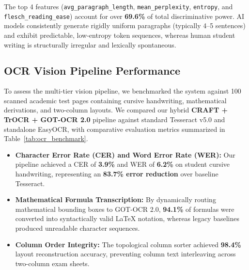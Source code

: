 \documentclass[journal]{IEEEtran}
\begin{document}
The top 4 features (\texttt{avg\_paragraph\_length}, \texttt{mean\_perplexity}, \texttt{entropy}, and \texttt{flesch\_reading\_ease}) account for over \textbf{69.6\%} of total discriminative power. AI models consistently generate rigidly uniform paragraphs (typically 4--5 sentences) and exhibit predictable, low-entropy token sequences, whereas human student writing is structurally irregular and lexically spontaneous.

\subsection{OCR Vision Pipeline Performance}
To assess the multi-tier vision pipeline, we benchmarked the system against 100 scanned academic test pages containing cursive handwriting, mathematical derivations, and two-column layouts. We compared our hybrid \textbf{CRAFT + TrOCR + GOT-OCR 2.0} pipeline against standard Tesseract v5.0 and standalone EasyOCR, with comparative evaluation metrics summarized in Table~\ref{tab:ocr_benchmark}.

\begin{table}[!t]
\caption{OCR Benchmark on Academic Assignments}
\label{tab:ocr_benchmark}
\centering
{}
\end{table}

\begin{itemize}
    \item \textbf{Character Error Rate (CER) and Word Error Rate (WER):} Our pipeline achieved a CER of \textbf{3.9\%} and WER of \textbf{6.2\%} on student cursive handwriting, representing an \textbf{83.7\% error reduction} over baseline Tesseract.
    \item \textbf{Mathematical Formula Transcription:} By dynamically routing mathematical bounding boxes to GOT-OCR 2.0, \textbf{94.1\%} of formulas were converted into syntactically valid \LaTeX{} notation, whereas legacy baselines produced unreadable character sequences.
    \item \textbf{Column Order Integrity:} The topological column sorter achieved \textbf{98.4\%} layout reconstruction accuracy, preventing column text interleaving across two-column exam sheets.
\end{itemize}
\end{document}
